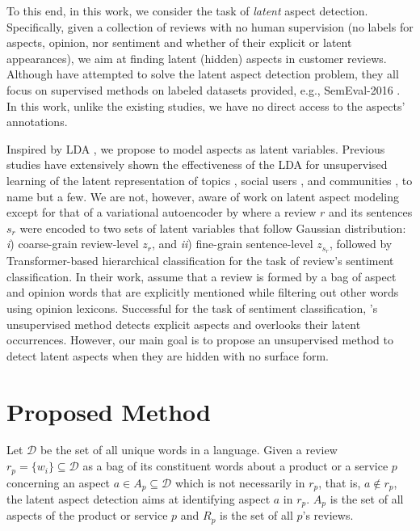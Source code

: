\documentclass[11pt]{article}
\begin{document}
To this end, in this work, we consider the task of \textit{latent} aspect detection. Specifically, given a collection of reviews with no human supervision (no labels for aspects, opinion, nor sentiment and whether of their explicit or latent appearances), we aim at finding latent (hidden) aspects in customer reviews. Although \citet{Marrese_Taylor_2013, Poria_2014, Chen_2016, Wan_2020} have attempted to solve the latent aspect detection problem, they all focus on supervised methods on labeled datasets provided, e.g., SemEval-2016 \cite{Pontiki_2016}. In this work, unlike the existing studies, we have no direct access to the aspects' annotations. 

Inspired by LDA \cite{Blei_2003}, we propose to model aspects as latent variables. Previous studies have extensively shown the effectiveness of the LDA for unsupervised learning of the latent representation of topics \cite{Cheng_2014}, social users \cite{Sun_2017}, and communities \cite{Xianghua_2013,Yonggan_Li_2016}, to name but a few. We are not, however, aware of work on latent aspect modeling except for that of a variational autoencoder by \cite{Fei_2021} where a review $r$ and its sentences $s_r$ were encoded to two sets of latent variables that follow Gaussian distribution: \textit{i}) coarse-grain review-level ${z_r}$, and \textit{ii}) fine-grain sentence-level $z_{s_r}$, followed by Transformer-based hierarchical classification for the task of review's sentiment classification. In their work, \citet{Fei_2021} assume that a review is formed by a bag of aspect and opinion words that are explicitly mentioned while filtering out other words using opinion lexicons. Successful for the task of sentiment classification, \citet{Fei_2021}'s unsupervised method detects explicit aspects and overlooks their latent occurrences. However, our main goal is to propose an unsupervised method to detect latent aspects when they are hidden with no surface form. 


\section{Proposed Method}
Let $\mathcal{D}$ be the set of all unique words in a language. Given a review $r_p = \{w_i\} \subseteq \mathcal{D}$ as a bag of its constituent words about a product or a service $p$ concerning an aspect $a \in A_p \subseteq \mathcal{D}$ which is not necessarily in $r_p$, that is, $a \notin r_p$, the latent aspect detection aims at identifying aspect $a$ in $r_p$. $A_p$ is the set of all aspects of the product or service $p$ and $R_p$ is the set of all $p$'s reviews. 
\end{document}
